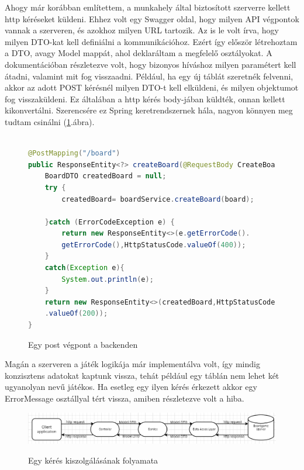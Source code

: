 \documentclass[a4paper,twoside]{article}
\begin{document}
Ahogy már korábban említettem, a munkahely által biztosított szerverre kellett http kéréseket
küldeni. Ehhez volt egy Swagger\cite{swagger} oldal, hogy milyen API végpontok vannak a szerveren, és
azokhoz milyen URL tartozik.  Az is le volt írva, hogy milyen DTO-kat kell definiálni a
kommunikációhoz. Ezért így először létrehoztam a DTO, avagy Model mappát, ahol deklaráltam a
megfelelő osztályokat. A dokumentációban részletezve volt, hogy bizonyos híváshoz milyen
paramétert kell átadni, valamint mit fog visszaadni. Például, ha egy új táblát szeretnék
felvenni, akkor az adott POST kérésnél milyen DTO-t kell elküldeni, és milyen objektumot
fog visszaküldeni. Ez általában a http kérés body-jában küldték, onnan kellett kikonvertálni. Szerencsére ez Spring keretrendszernek hála, nagyon könnyen meg tudtam csinálni (\ref{post-vegpont}.ábra).
\begin{figure}
	\caption{Egy post végpont a backenden}
	

	\begin{minipage}{\textwidth}
	\begin{lstlisting}[language=java]
		
@PostMapping("/board")
public ResponseEntity<?> createBoard(@RequestBody CreateBoardDTO board) {
	BoardDTO createdBoard = null;
	try {
		createdBoard= boardService.createBoard(board);
		
	}catch (ErrorCodeException e) {
		return new ResponseEntity<>(e.getErrorCode().
		getErrorCode(),HttpStatusCode.valueOf(400));
	}
	catch(Exception e){
		System.out.println(e);
	}
	return new ResponseEntity<>(createdBoard,HttpStatusCode
	.valueOf(200));
}
	\end{lstlisting}
\end{minipage}

	\label{post-vegpont}
\end{figure} 

Magán a szerveren a játék logikája már implementálva volt, így mindig
konzisztens adatokat kaptunk vissza, tehát például egy táblán nem lehet két ugyanolyan nevű
játékos. Ha esetleg egy ilyen kérés érkezett akkor egy ErrorMessage osztállyal tért vissza,
amiben részletezve volt a hiba.

\begin{figure}
	\caption{Egy kérés kiszolgálásának folyamata}
	\raggedleft 
	\includegraphics[scale=0.5]{backend-pipeline}
	\label{backend-pipeline}
\end{figure}
\end{document}
